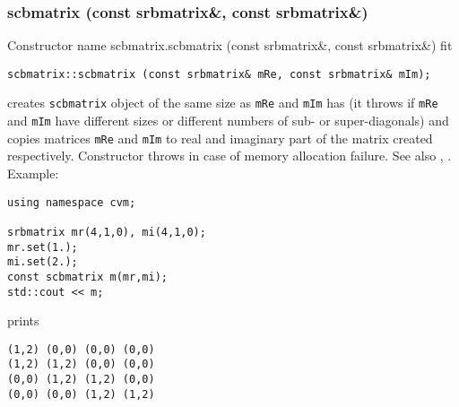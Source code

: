 \subsubsection{scbmatrix (const srbmatrix\&, const srbmatrix\&)}
Constructor%
\pdfdest name {scbmatrix.scbmatrix (const srbmatrix&, const srbmatrix&)} fit
\begin{verbatim}
scbmatrix::scbmatrix (const srbmatrix& mRe, const srbmatrix& mIm);
\end{verbatim}
creates  \verb"scbmatrix" object
of the same size as \verb"mRe" and \verb"mIm" has
(it throws 
if \verb"mRe" and
\verb"mIm" have different sizes or different numbers
of sub- or super-diagonals)
and copies matrices \verb"mRe" and \verb"mIm"
to  real and imaginary part of the matrix created respectively.
Constructor throws  
in case of memory allocation failure.
See also , .
Example:
\begin{Verbatim}
using namespace cvm;

srbmatrix mr(4,1,0), mi(4,1,0);
mr.set(1.);
mi.set(2.);
const scbmatrix m(mr,mi);
std::cout << m;
\end{Verbatim}
prints
\begin{Verbatim}
(1,2) (0,0) (0,0) (0,0)
(1,2) (1,2) (0,0) (0,0)
(0,0) (1,2) (1,2) (0,0)
(0,0) (0,0) (1,2) (1,2)
\end{Verbatim}
\newpage




